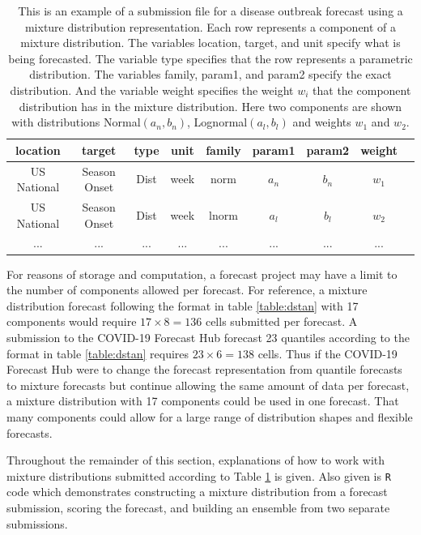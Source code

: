 \documentclass[11pt,notitlepage]{isuthesis}
\begin{document}
\begin{table}[h!]
\centering
 \begin{tabular}{|c|c|c|c|c|c|c|c|c|}
 \hline
    location & target & type & unit & family & param1 & param2 & weight
    \\ \hline
    US National & Season Onset & Dist & week & norm & $a_n$ & $b_n$ & $w_1$\\
    US National & Season Onset & Dist & week & lnorm & $a_l$ & $b_l$ & $w_2$\\
    ... & ... & ... & ... & ... & ... & ... & ...\\
 \hline
 \end{tabular}
 \begin{minipage}{11cm}
\captionsetup{font=scriptsize}
 \caption[Mixture distribution forecast submission example]{This is an example 
 of a 
 submission file
 for a disease outbreak forecast using a mixture distribution representation.
 Each row represents a component of a mixture distribution. The variables
 location, target, and unit specify what is being forecasted. The variable type
 specifies that the row represents a parametric distribution. The variables
 family, param1, and param2 specify the exact distribution. And the variable 
 weight specifies the weight $w_i$ that the component distribution has in the
 mixture distribution. Here two components are shown with distributions
 Normal$(a_n, b_n)$, Lognormal$(a_l, b_l)$ and weights $w_1$ and $w_2$.}
 \label{table:mstan}
 \end{minipage}
\end{table}

For reasons of storage and computation, a forecast project may have a limit to 
the number of components allowed per forecast.
For reference, a mixture distribution forecast following the 
format in table \ref{table:dstan} with 17
components would require $17 \times 8 = 136$ cells submitted per forecast. 
A submission to the COVID-19 Forecast Hub forecast 23 quantiles
according to the format in table \ref{table:dstan} requires
$23 \times 6 = 138$ cells. Thus if the COVID-19 Forecast Hub were to change the
forecast representation from quantile forecasts to mixture forecasts but 
continue allowing the same amount of data per forecast, 
a mixture distribution with 17 components could be used in one forecast. That
many components could allow for a large range of distribution shapes and 
flexible forecasts.

Throughout the remainder of this section, explanations of how to work with 
mixture distributions submitted according to Table \ref{table:mstan} is 
given. Also given is
\texttt{R} code which 
demonstrates constructing a mixture distribution from a forecast submission, 
scoring the forecast, and building an ensemble from two separate submissions.
\end{document}

